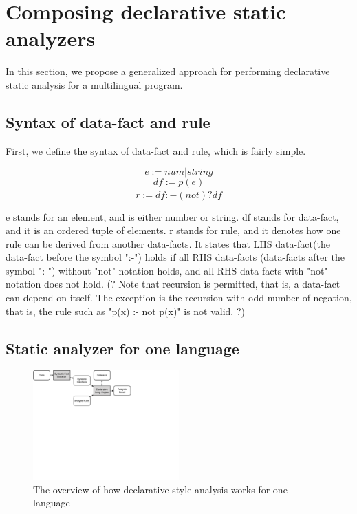 \section{Composing declarative static analyzers}

In this section, we propose a generalized approach for performing declarative
static analysis for a multilingual program.

\subsection{Syntax of data-fact and rule}

First, we define the syntax of data-fact and rule, which is fairly simple.

\[e := num | string\]
\[df := p(\overline{e})\]
\[r := df :- \overline{(not)? df}\]

e stands for an element, and is either number or string.  df stands for
data-fact, and it is an ordered tuple of elements.  r stands for rule, and it
denotes how one rule can be derived from another data-facts.  It states that
LHS data-fact(the data-fact before the symbol ":-") holds if all RHS data-facts
(data-facts after the symbol ":-") without "not" notation holds, and all RHS
data-facts with "not" notation does not hold.  (? Note that recursion is
permitted, that is, a data-fact can depend on itself.  The exception is the
recursion with odd number of negation, that is, the rule such as "p(x) :- not
p(x)" is not valid. ?)

\subsection{Static analyzer for one language}

\begin{figure}[t]
  \centering
  \vspace{2mm}
  \includegraphics[width=0.5\textwidth]{img/overview}
  \vspace*{-1.5em}
  \caption{The overview of how declarative style analysis works for
  one language}
  \label{fig:overview}
\vspace*{-.5em}
\end{figure}

